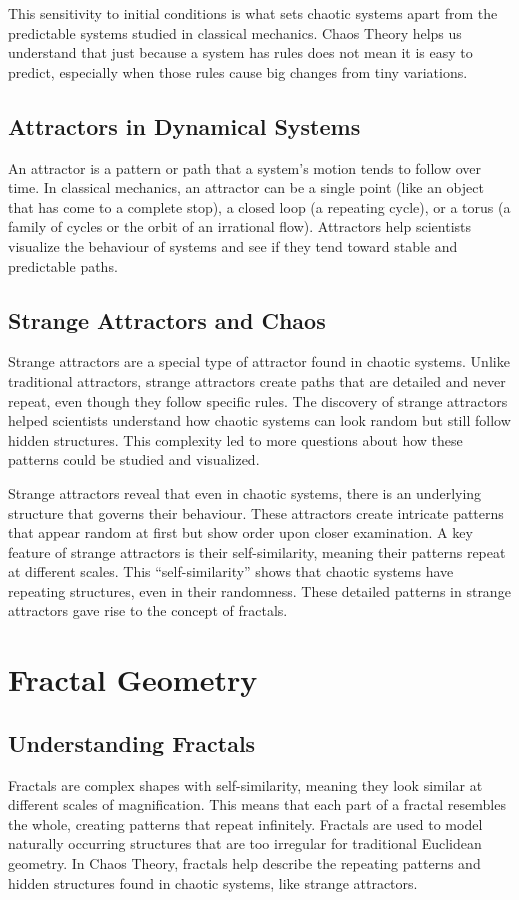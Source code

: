 \documentclass[12pt]{article}
\begin{document}
This sensitivity to initial conditions is what sets chaotic systems apart from the predictable systems studied in classical mechanics. Chaos Theory helps us understand that just because a system has rules does not mean it is easy to predict, especially when those rules cause big changes from tiny variations.

\subsection{Attractors in Dynamical Systems}
An attractor is a pattern or path that a system’s motion tends to follow over time. In classical mechanics, an attractor can be a single point (like an object that has come to a complete stop), a closed loop (a repeating cycle), or a torus (a family of cycles or the orbit of an irrational flow). Attractors help scientists visualize the behaviour of systems and see if they tend toward stable and predictable paths.

\subsection{Strange Attractors and Chaos}
Strange attractors are a special type of attractor found in chaotic systems. Unlike traditional attractors, strange attractors create paths that are detailed and never repeat, even though they follow specific rules. The discovery of strange attractors helped scientists understand how chaotic systems can look random but still follow hidden structures. This complexity led to more questions about how these patterns could be studied and visualized.

Strange attractors reveal that even in chaotic systems, there is an underlying structure that governs their behaviour. These attractors create intricate patterns that appear random at first but show order upon closer examination. A key feature of strange attractors is their self-similarity, meaning their patterns repeat at different scales. This ``self-similarity'' shows that chaotic systems have repeating structures, even in their randomness. These detailed patterns in strange attractors gave rise to the concept of fractals.

\section{Fractal Geometry}


\subsection{Understanding Fractals}
Fractals are complex shapes with self-similarity, meaning they look similar at different scales of magnification. This means that each part of a fractal resembles the whole, creating patterns that repeat infinitely. Fractals are used to model naturally occurring structures that are too irregular for traditional Euclidean geometry. In Chaos Theory, fractals help describe the repeating patterns and hidden structures found in chaotic systems, like strange attractors. 
\end{document}
